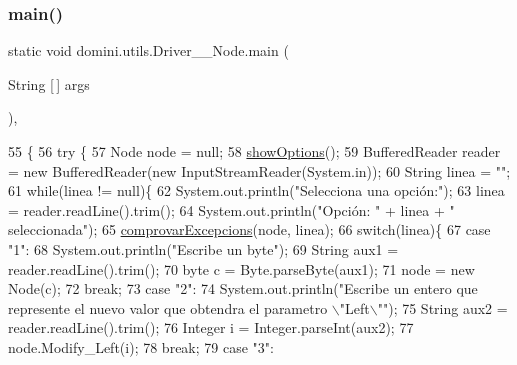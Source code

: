 \subsubsection{\texorpdfstring{main()}{main()}}
{\footnotesize\ttfamily static void domini.\+utils.\+Driver\+\_\+\+\_\+\+Node.\+main (\begin{DoxyParamCaption}\item[{String \mbox{[}$\,$\mbox{]}}]{args }\end{DoxyParamCaption})\hspace{0.3cm}{\ttfamily [inline]}, {\ttfamily [static]}}


\begin{DoxyCode}
55                                            \{
56     \textcolor{keywordflow}{try} \{
57         Node node = null;
58         \hyperlink{classdomini_1_1utils_1_1Driver____Node_a3e1022f470676f7cbbeb44b9b2d4f66f}{showOptions}();
59         BufferedReader reader = \textcolor{keyword}{new} BufferedReader(\textcolor{keyword}{new} InputStreamReader(System.in));
60         String linea = \textcolor{stringliteral}{""};
61         \textcolor{keywordflow}{while}(linea != null)\{
62             System.out.println(\textcolor{stringliteral}{"Selecciona una opción:"});
63             linea = reader.readLine().trim();
64             System.out.println(\textcolor{stringliteral}{"Opción: "} + linea + \textcolor{stringliteral}{" seleccionada"});
65             \hyperlink{classdomini_1_1utils_1_1Driver____Node_a9fdd311953250227bb70d67cbf20bbb4}{comprovarExcepcions}(node, linea);
66             \textcolor{keywordflow}{switch}(linea)\{
67                 \textcolor{keywordflow}{case} \textcolor{stringliteral}{"1"}:
68                     System.out.println(\textcolor{stringliteral}{"Escribe un byte"});
69                     String aux1 = reader.readLine().trim();
70                     byte c = Byte.parseByte(aux1);
71                     node = \textcolor{keyword}{new} Node(c);
72                 \textcolor{keywordflow}{break};
73                 \textcolor{keywordflow}{case} \textcolor{stringliteral}{"2"}:
74                     System.out.println(\textcolor{stringliteral}{"Escribe un entero que represente el nuevo valor que obtendra el
       parametro \(\backslash\)"Left\(\backslash\)""});
75                     String aux2 = reader.readLine().trim();
76                     Integer i = Integer.parseInt(aux2);
77                     node.Modify\_Left(i);
78                 \textcolor{keywordflow}{break};
79                 \textcolor{keywordflow}{case} \textcolor{stringliteral}{"3"}:

\end{DoxyCode}
